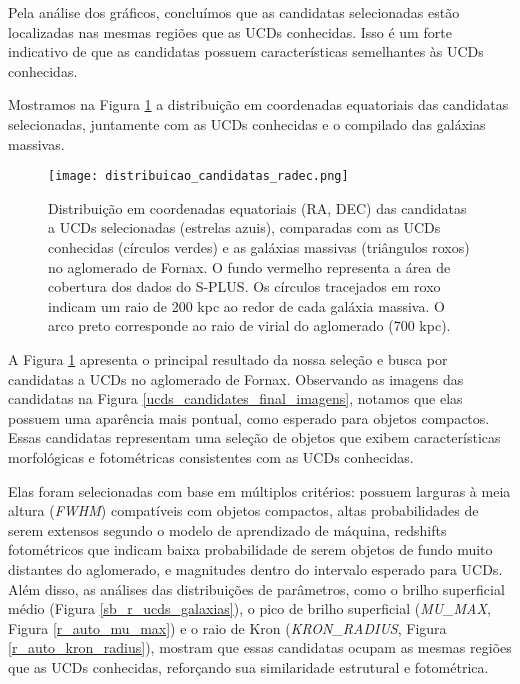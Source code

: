 Pela análise dos gráficos, concluímos que as candidatas selecionadas estão localizadas nas mesmas regiões que as UCDs conhecidas. Isso é um forte indicativo de que as candidatas possuem características semelhantes às UCDs conhecidas.

Mostramos na Figura \ref{distribuicao_candidatas_radec} a distribuição em coordenadas equatoriais das candidatas selecionadas, juntamente com as UCDs conhecidas e o compilado das galáxias massivas.

\begin{figure}[!ht]
    \begin{center}
    \texttt{[image: distribuicao\_candidatas\_radec.png]}
    \caption[]{Distribuição em coordenadas equatoriais (RA, DEC) das candidatas a UCDs selecionadas (estrelas azuis), comparadas com as UCDs conhecidas (círculos verdes) e as galáxias massivas (triângulos roxos) no aglomerado de Fornax. O fundo vermelho representa a área de cobertura dos dados do S-PLUS. Os círculos tracejados em roxo indicam um raio de 200 kpc ao redor de cada galáxia massiva. O arco preto corresponde ao raio de virial do aglomerado (700 kpc).}
    \label{distribuicao_candidatas_radec}
    \end{center}
\end{figure}

A Figura \ref{distribuicao_candidatas_radec} apresenta o principal resultado da nossa seleção e busca por candidatas a UCDs no aglomerado de Fornax. Observando as imagens das candidatas na Figura \ref{ucds_candidates_final_imagens}, notamos que elas possuem uma aparência mais pontual, como esperado para objetos compactos. Essas candidatas representam uma seleção de objetos que exibem características morfológicas e fotométricas consistentes com as UCDs conhecidas.

Elas foram selecionadas com base em múltiplos critérios: possuem larguras à meia altura (\textit{FWHM}) compatíveis com objetos compactos, altas probabilidades de serem extensos segundo o modelo de aprendizado de máquina, redshifts fotométricos que indicam baixa probabilidade de serem objetos de fundo muito distantes do aglomerado, e magnitudes dentro do intervalo esperado para UCDs. Além disso, as análises das distribuições de parâmetros, como o brilho superficial médio (Figura \ref{sb_r_ucds_galaxias}), o pico de brilho superficial (\textit{MU\_MAX}, Figura \ref{r_auto_mu_max}) e o raio de Kron (\textit{KRON\_RADIUS}, Figura \ref{r_auto_kron_radius}), mostram que essas candidatas ocupam as mesmas regiões que as UCDs conhecidas, reforçando sua similaridade estrutural e fotométrica.

